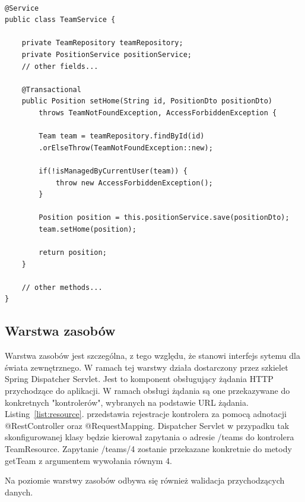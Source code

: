 \begin{minipage}{\linewidth}
\begin{lstlisting}[label=list:service, caption=Fragment przykładowego serwisu, basicstyle=\footnotesize\ttfamily]

@Service
public class TeamService {

    private TeamRepository teamRepository;
    private PositionService positionService;
    // other fields...
    
    @Transactional
    public Position setHome(String id, PositionDto positionDto) 
    	throws TeamNotFoundException, AccessForbiddenException {
    
        Team team = teamRepository.findById(id)
        .orElseThrow(TeamNotFoundException::new);
        
        if(!isManagedByCurrentUser(team)) {
            throw new AccessForbiddenException();
        }

        Position position = this.positionService.save(positionDto);
        team.setHome(position);

        return position;
    }
    
    // other methods...
}
\end{lstlisting}
\end{minipage}


\subsection{Warstwa zasobów}

Warstwa zasobów jest szczególna, z tego względu, że stanowi interfejs sytemu dla świata zewnętrznego. W ramach tej warstwy działa dostarczony przez szkielet Spring Dispatcher Servlet. Jest to komponent obsługujący żądania HTTP przychodzące do aplikacji. W ramach obsługi żądania są one przekazywane do konkretnych "kontrolerów", wybranych na podstawie URL żądania. Listing~\ref{list:resource}. przedstawia rejestracje kontrolera za pomocą adnotacji @RestController oraz @RequestMapping. Dispatcher Servlet w przypadku tak skonfigurowanej klasy będzie kierował zapytania o adresie /teams do kontrolera TeamResource. Zapytanie /teams/4  zostanie przekazane konkretnie do metody getTeam z argumentem wywołania równym 4.

Na poziomie warstwy zasobów odbywa się również walidacja przychodzących danych.

